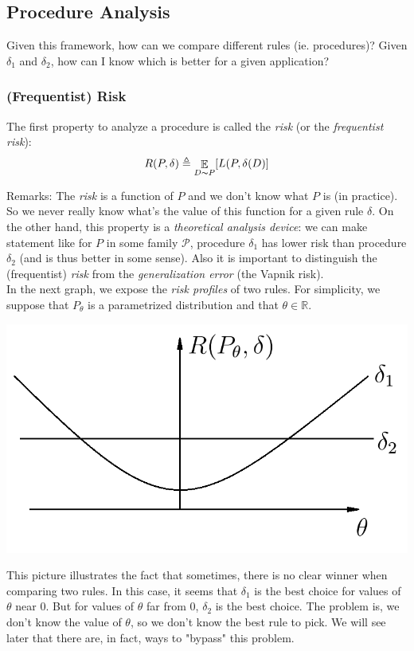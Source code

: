 \documentclass[12pt]{report}
\DeclareMathOperator{\E}{\mathbb{E}}
\begin{document}
\subsection{Procedure Analysis}

Given this framework, how can we compare different rules (ie. procedures)? Given $\delta_1$ and $\delta_2$, how can I know which is better for a given application?
\subsubsection{(Frequentist) Risk}
The first property to analyze a procedure is called the \textit{risk} (or the \textit{frequentist risk}):
$$R(P,\delta) \triangleq \E_{D \thicksim P}[L(P,\delta(D)]$$

Remarks: The \textit{risk} is a function of $P$ and we don't know what $P$ is (in practice). So we never really know what's the value of this function for a given rule $\delta$. On the other hand, this property is a \textit{theoretical analysis device}: we can make statement like for $P$ in some family $\mathcal{P}$, procedure $\delta_1$ has lower risk than procedure $\delta_2$ (and is thus better in some sense). Also it is important to distinguish the (frequentist) \textit{risk} from the \textit{generalization error} (the Vapnik risk). \\

In the next graph, we expose the \textit{risk profiles} of two rules. For simplicity, we suppose that $P_\theta$ is a parametrized distribution and that $\theta \in \mathbb{R}$.

\centerline{\includegraphics[scale=0.3]{graph_1.png}}

This picture illustrates the fact that sometimes, there is no clear winner when comparing two rules. In this case, it seems that $\delta_1$ is the best choice for values of $\theta$ near $0$. But for values of $\theta$ far from $0$, $\delta_2$ is the best choice. The problem is, we don't know the value of $\theta$, so we don't know the best rule to pick. We will see later that there are, in fact, ways to "bypass" this problem.
\end{document}
